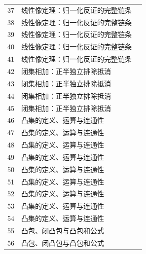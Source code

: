 \begin{longtable}{r p{.66\linewidth} r}
37 & 线性像定理：归一化反证的完整链条 & \pageref{g:109:37}\\

38 & 线性像定理：归一化反证的完整链条 & \pageref{g:109:37}\\

39 & 线性像定理：归一化反证的完整链条 & \pageref{g:109:37}\\

40 & 线性像定理：归一化反证的完整链条 & \pageref{g:109:37}\\

41 & 线性像定理：归一化反证的完整链条 & \pageref{g:109:37}\\

42 & 闭集相加：正半独立排除抵消 & \pageref{g:109:42}\\

43 & 闭集相加：正半独立排除抵消 & \pageref{g:109:42}\\

44 & 闭集相加：正半独立排除抵消 & \pageref{g:109:42}\\

45 & 闭集相加：正半独立排除抵消 & \pageref{g:109:42}\\

46 & 凸集的定义、运算与连通性 & \pageref{g:109:46}\\

47 & 凸集的定义、运算与连通性 & \pageref{g:109:46}\\

48 & 凸集的定义、运算与连通性 & \pageref{g:109:46}\\

49 & 凸集的定义、运算与连通性 & \pageref{g:109:46}\\

50 & 凸集的定义、运算与连通性 & \pageref{g:109:46}\\

51 & 凸集的定义、运算与连通性 & \pageref{g:109:46}\\

52 & 凸集的定义、运算与连通性 & \pageref{g:109:46}\\

53 & 凸集的定义、运算与连通性 & \pageref{g:109:46}\\

54 & 凸集的定义、运算与连通性 & \pageref{g:109:46}\\

55 & 凸包、闭凸包与凸包和公式 & \pageref{g:109:55}\\

56 & 凸包、闭凸包与凸包和公式 & \pageref{g:109:55}\\


\end{longtable}
